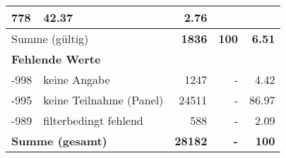\begin{longtable}{lXrrr}
       \num{778} &
       \num[round-mode=places,round-precision=2]{42.37} &
         \num[round-mode=places,round-precision=2]{2.76} \\
     \midrule
     \multicolumn{2}{l}{Summe (gültig)} &
       \textbf{\num{1836}} &
     \textbf{100} &
       \textbf{\num[round-mode=places,round-precision=2]{6.51}} \\
     \multicolumn{5}{l}{\textbf{Fehlende Werte}}\\
       -998 &
       keine Angabe &
         \num{1247} &
        - &
         \num[round-mode=places,round-precision=2]{4.42} \\
       -995 &
       keine Teilnahme (Panel) &
         \num{24511} &
        - &
         \num[round-mode=places,round-precision=2]{86.97} \\
       -989 &
       filterbedingt fehlend &
         \num{588} &
        - &
         \num[round-mode=places,round-precision=2]{2.09} \\
     \midrule
     \multicolumn{2}{l}{\textbf{Summe (gesamt)}} &
          \textbf{\num{28182}} &
        \textbf{-} &
        \textbf{100} \\
     \bottomrule
     \end{longtable}
     
